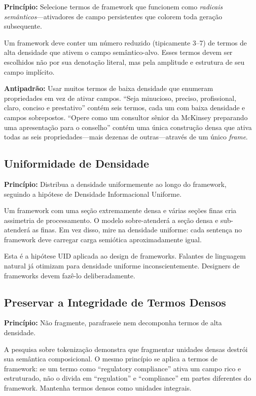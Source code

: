\documentclass[12pt,a4paper]{article}
\begin{document}
\textbf{Princípio:} Selecione termos de framework que funcionem como \textit{radicais semânticos}---ativadores de campo persistentes que colorem toda geração subsequente.

Um framework deve conter um número reduzido (tipicamente 3--7) de termos de alta densidade que ativem o campo semântico-alvo.
Esses termos devem ser escolhidos não por sua denotação literal, mas pela amplitude e estrutura de seu campo implícito.

\textbf{Antipadrão:} Usar muitos termos de baixa densidade que enumeram propriedades em vez de ativar campos.
``Seja minucioso, preciso, profissional, claro, conciso e prestativo'' contém seis termos, cada um com baixa densidade e campos sobrepostos.
``Opere como um consultor sênior da McKinsey preparando uma apresentação para o conselho'' contém uma única construção densa que ativa todas as seis propriedades---mais dezenas de outras---através de um único \textit{frame}.

\subsection{Uniformidade de Densidade}
\label{subsec:uniformity}

\textbf{Princípio:} Distribua a densidade uniformemente ao longo do framework, seguindo a hipótese de Densidade Informacional Uniforme.

Um framework com uma seção extremamente densa e várias seções finas cria assimetria de processamento.
O modelo sobre-atenderá a seção densa e sub-atenderá as finas.
Em vez disso, mire na densidade uniforme: cada sentença no framework deve carregar carga semiótica aproximadamente igual.

Esta é a hipótese UID \cite{frank2008} aplicada ao design de frameworks.
Falantes de linguagem natural já otimizam para densidade uniforme inconscientemente.
Designers de frameworks devem fazê-lo deliberadamente.

\subsection{Preservar a Integridade de Termos Densos}
\label{subsec:integrity}

\textbf{Princípio:} Não fragmente, parafraseie nem decomponha termos de alta densidade.

A pesquisa sobre tokenização \cite{cao2025} demonstra que fragmentar unidades densas destrói sua semântica composicional.
O mesmo princípio se aplica a termos de framework: se um termo como ``regulatory compliance'' ativa um campo rico e estruturado, não o divida em ``regulation'' e ``compliance'' em partes diferentes do framework.
Mantenha termos densos como unidades integrais.
\end{document}
